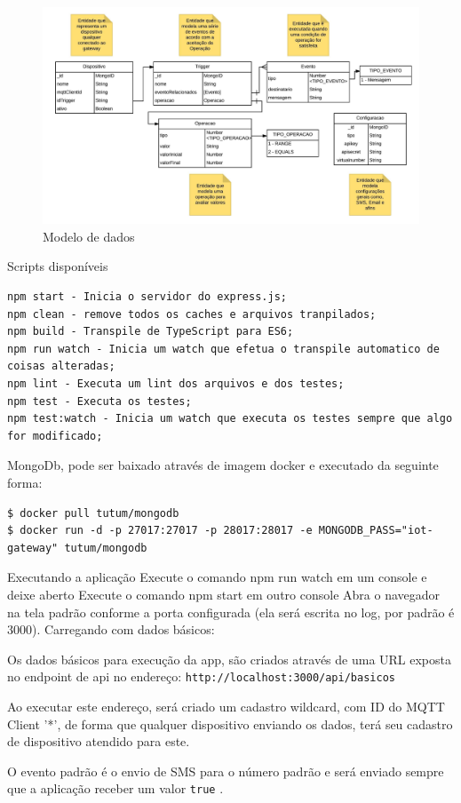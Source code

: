 \begin{figure}
	\centering
	\includegraphics[width=1\textwidth]{./img/modelo-de-dados}
	\caption{Modelo de dados}
	\label{fig:modeloDeDados}
\end{figure}

Scripts disponíveis
\begin{verbatim}
npm start - Inicia o servidor do express.js;
npm clean - remove todos os caches e arquivos tranpilados;
npm build - Transpile de TypeScript para ES6;
npm run watch - Inicia um watch que efetua o transpile automatico de coisas alteradas;
npm lint - Executa um lint dos arquivos e dos testes;
npm test - Executa os testes;
npm test:watch - Inicia um watch que executa os testes sempre que algo for modificado;
\end{verbatim}

MongoDb, pode ser baixado através de imagem docker e executado da seguinte forma:
\begin{verbatim}
$ docker pull tutum/mongodb
$ docker run -d -p 27017:27017 -p 28017:28017 -e MONGODB_PASS="iot-gateway" tutum/mongodb
\end{verbatim}

Executando a aplicação
Execute o comando npm run watch em um console e deixe aberto
Execute o comando npm start em outro console
Abra o navegador na tela padrão conforme a porta configurada (ela será escrita no log, por padrão é 3000).
Carregando com dados básicos:

Os dados básicos para execução da app, são criados através de uma URL exposta no endpoint de api no endereço: \verb|http://localhost:3000/api/basicos|

Ao executar este endereço, será criado um cadastro wildcard, com ID do MQTT Client '*', de forma que qualquer dispositivo enviando os dados, terá seu cadastro de dispositivo atendido para este.

O evento padrão é o envio de SMS para o número padrão e será enviado sempre que a aplicação receber um valor \verb|true|	.